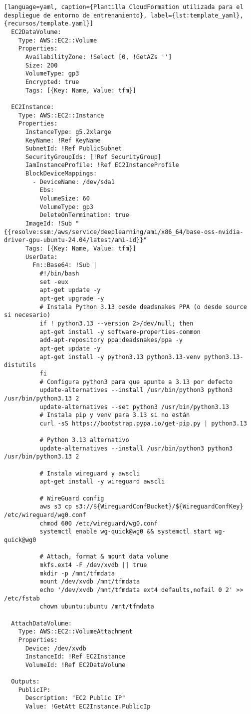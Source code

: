 \begin{lstlisting}[language=yaml, caption={Plantilla CloudFormation utilizada para el despliegue de entorno de entrenamiento}, label={lst:template_yaml}, {recursos/template.yaml}]
  EC2DataVolume:
    Type: AWS::EC2::Volume
    Properties:
      AvailabilityZone: !Select [0, !GetAZs '']
      Size: 200
      VolumeType: gp3
      Encrypted: true
      Tags: [{Key: Name, Value: tfm}]
  
  EC2Instance:
    Type: AWS::EC2::Instance
    Properties:
      InstanceType: g5.2xlarge
      KeyName: !Ref KeyName
      SubnetId: !Ref PublicSubnet
      SecurityGroupIds: [!Ref SecurityGroup]
      IamInstanceProfile: !Ref EC2InstanceProfile
      BlockDeviceMappings:
        - DeviceName: /dev/sda1
          Ebs:
          VolumeSize: 60
          VolumeType: gp3
          DeleteOnTermination: true
      ImageId: !Sub "{{resolve:ssm:/aws/service/deeplearning/ami/x86_64/base-oss-nvidia-driver-gpu-ubuntu-24.04/latest/ami-id}}"
      Tags: [{Key: Name, Value: tfm}]
      UserData:
        Fn::Base64: !Sub |
          #!/bin/bash
          set -eux
          apt-get update -y
          apt-get upgrade -y
          # Instala Python 3.13 desde deadsnakes PPA (o desde source si necesario)
          if ! python3.13 --version 2>/dev/null; then
          apt-get install -y software-properties-common
          add-apt-repository ppa:deadsnakes/ppa -y
          apt-get update -y
          apt-get install -y python3.13 python3.13-venv python3.13-distutils
          fi
          # Configura python3 para que apunte a 3.13 por defecto
          update-alternatives --install /usr/bin/python3 python3 /usr/bin/python3.13 2
          update-alternatives --set python3 /usr/bin/python3.13
          # Instala pip y venv para 3.13 si no están
          curl -sS https://bootstrap.pypa.io/get-pip.py | python3.13
          
          # Python 3.13 alternativo
          update-alternatives --install /usr/bin/python3 python3 /usr/bin/python3.13 2
          
          # Instala wireguard y awscli
          apt-get install -y wireguard awscli
          
          # WireGuard config
          aws s3 cp s3://${WireguardConfBucket}/${WireguardConfKey} /etc/wireguard/wg0.conf
          chmod 600 /etc/wireguard/wg0.conf
          systemctl enable wg-quick@wg0 && systemctl start wg-quick@wg0
          
          # Attach, format & mount data volume
          mkfs.ext4 -F /dev/xvdb || true
          mkdir -p /mnt/tfmdata
          mount /dev/xvdb /mnt/tfmdata
          echo '/dev/xvdb /mnt/tfmdata ext4 defaults,nofail 0 2' >> /etc/fstab
          chown ubuntu:ubuntu /mnt/tfmdata
  
  AttachDataVolume:
    Type: AWS::EC2::VolumeAttachment
    Properties:
      Device: /dev/xvdb
      InstanceId: !Ref EC2Instance
      VolumeId: !Ref EC2DataVolume
  
  Outputs:
    PublicIP:
      Description: "EC2 Public IP"
      Value: !GetAtt EC2Instance.PublicIp
\end{lstlisting}